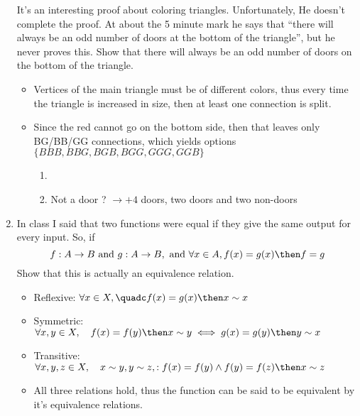 \documentclass[basic, header]{nosvagor-notes}
\begin{document}
\begin{enumerate}[itemsep=5em]
      It's an interesting proof about coloring triangles. Unfortunately, He
      doesn't complete the proof. At about the 5 minute mark he says that
      ``there will always be an odd number of doors at the bottom of the
      triangle'',  but he never proves this. Show that there will always be an
      odd number of doors on the bottom of the triangle.

      \begin{itemize}
        \item Vertices of the main triangle must be of different colors, thus every
          time the triangle is increased in size, then at least one connection
          is split.
        \item Since the red cannot go on the bottom side, then that leaves only
          BG/BB/GG connections, which yields options \(\{ BBB, BBG, BGB, BGG, GGG, GGB \}\)
          \begin{enumerate}[leftmargin=2em]
            \item

            \item Not a door ? \(\to + 4\) doors, two doors and two non-doors

          \end{enumerate}

      \end{itemize}

  \newpage %

    \item In class I said that two functions were equal if they give the same
      output for every input. So, if
      \[f : A \to B ~\text{and}~ g : A \to B, ~\text{and}~ \forall x\in A,
      f(x) = g(x)
      \then f= g
      \]
      Show that this is actually an equivalence relation.

      \begin{itemize}
        \item Reflexive: \(\forall x \in X, \quadc f(x) = g(x) \then x \sim x\)
        \item Symmetric: \(\forall x,y \in X, \quad f(x) = f(y) \then x \sim y \iff g(x) = g(y) \then y \sim x\)
        \item Transitive: \(\forall x,y,z \in X, \quad x \sim y, y \sim z, : f(x) = f(y) \land f(y) = f(z) \then x \sim z\)
        \item All three relations hold, thus the function can be said to be equivalent by it's equivalence relations.
      \end{itemize}


\end{enumerate}
\end{document}
